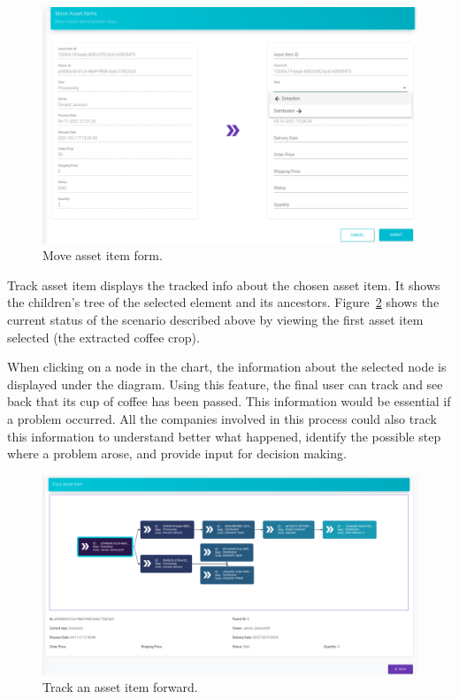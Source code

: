 \begin{figure}[H]
\begin{center}
  \includegraphics[scale=0.32]{images/use_example/091_move_asset_Item.png}
\caption{Move asset item form.}
\label{fig:move_asset_item}
\end{center}
\end{figure}

Track asset item displays the tracked info about the chosen asset item. It shows the children's tree of the selected element and its ancestors. Figure~\ref{fig:track_asset_item} shows the current status of the scenario described above by viewing the first asset item selected (the extracted coffee crop).

When clicking on a node in the chart, the information about the selected node is displayed under the diagram. Using this feature, the final user can track and see back that its cup of coffee has been passed. This information would be essential if a problem occurred. All the companies involved in this process could also track this information to understand better what happened, identify the possible step where a problem arose, and provide input for decision making.

\begin{figure}[H]
\begin{center}
  \includegraphics[scale=0.275]{images/use_example/092_track_asset_Item.png}
\caption{Track an asset item forward.}
\label{fig:track_asset_item}
\end{center}
\end{figure}


